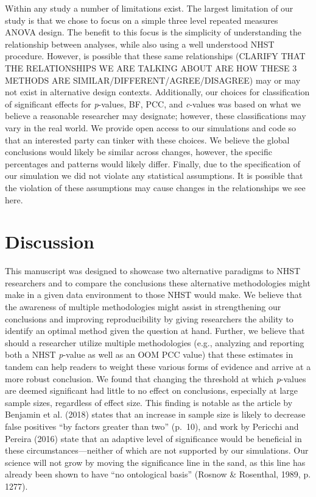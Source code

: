 \documentclass[english,man]{apa6}
\theoremstyle{definition}
\theoremstyle{definition}
\theoremstyle{definition}
\theoremstyle{remark}
\begin{document}
Within any study a number of limitations exist. The largest limitation
of our study is that we chose to focus on a simple three level repeated
measures ANOVA design. The benefit to this focus is the simplicity of
understanding the relationship between analyses, while also using a well
understood NHST procedure. However, is possible that these same
relationships (CLARIFY THAT THE RELATIONSHIPS WE ARE TALKING ABOUT ARE
HOW THESE 3 METHODS ARE SIMILAR/DIFFERENT/AGREE/DISAGREE) may or may not
exist in alternative design contexts. Additionally, our choices for
classification of significant effects for \emph{p}-values, BF, PCC, and
\emph{c}-values was based on what we believe a reasonable researcher may
designate; however, these classifications may vary in the real world. We
provide open access to our simulations and code so that an interested
party can tinker with these choices. We believe the global conclusions
would likely be similar across changes, however, the specific
percentages and patterns would likely differ. Finally, due to the
specification of our simulation we did not violate any statistical
assumptions. It is possible that the violation of these assumptions may
cause changes in the relationships we see here.

\section{Discussion}\label{discussion}

This manuscript was designed to showcase two alternative paradigms to
NHST researchers and to compare the conclusions these alternative
methodologies might make in a given data environment to those NHST would
make. We believe that the awareness of multiple methodologies might
assist in strengthening our conclusions and improving reproducibility by
giving researchers the ability to identify an optimal method given the
question at hand. Further, we believe that should a researcher utilize
multiple methodologies (e.g., analyzing and reporting both a NHST
\emph{p}-value as well as an OOM PCC value) that these estimates in
tandem can help readers to weight these various forms of evidence and
arrive at a more robust conclusion. We found that changing the threshold
at which \emph{p}-values are deemed significant had little to no effect
on conclusions, especially at large sample sizes, regardless of effect
size. This finding is notable as the article by Benjamin et al. (2018)
states that an increase in sample size is likely to decrease false
positives \enquote{by factors greater than two} (p.~10), and work by
Pericchi and Pereira (2016) state that an adaptive level of significance
would be beneficial in these circumstances---neither of which are not
supported by our simulations. Our science will not grow by moving the
significance line in the sand, as this line has already been shown to
have \enquote{no ontological basis} (Rosnow \& Rosenthal, 1989, p.
1277).
\end{document}
